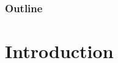 \documentclass[10pt, xcolor=dvipsnames]{beamer} %
\newcommand{\figpath}{../graphics/}
\begin{document}
 \begin{frame}
   \frametitle{Outline}
   \tableofcontents
   \addtocounter{framenumber}{-1} 
 \end{frame}


\section{Introduction}
%   
% 
\end{document}
